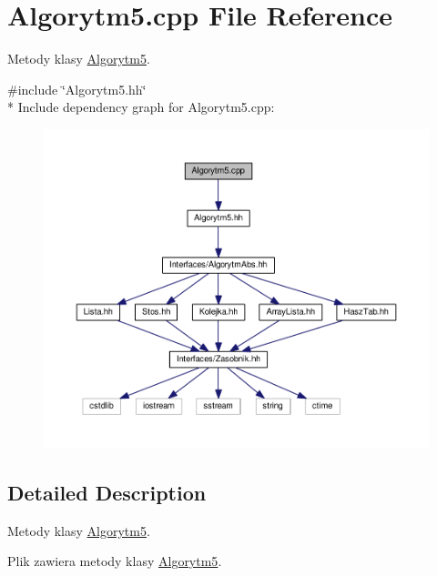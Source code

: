 \hypertarget{a00026}{}\section{Algorytm5.\+cpp File Reference}
\label{a00026}


Metody klasy \hyperlink{a00006}{Algorytm5}.  


{\ttfamily \#include \char`\"{}Algorytm5.\+hh\char`\"{}}\\*
Include dependency graph for Algorytm5.\+cpp\+:
\nopagebreak
\begin{figure}[H]
\begin{center}
\leavevmode
\includegraphics[width=350pt]{a00065}
\end{center}
\end{figure}


\subsection{Detailed Description}
Metody klasy \hyperlink{a00006}{Algorytm5}. 

Plik zawiera metody klasy \hyperlink{a00006}{Algorytm5}. 